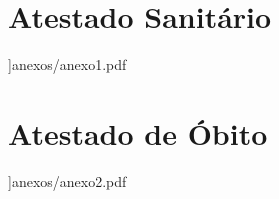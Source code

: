 
\begin{anexosenv}
\anexos
\partanexos

%





%
\chapter{Atestado Sanitário}
{}]{anexos/anexo1.pdf}

\chapter{Atestado de Óbito}
{}]{anexos/anexo2.pdf}


\end{anexosenv}
